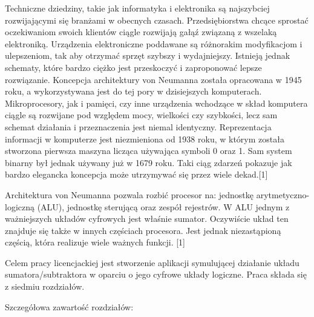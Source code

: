 \documentclass[12pt, a4paper, onside, polish]{article}				%
\begin{document}
Techniczne dziedziny, takie jak informatyka i elektronika są najszybciej rozwijającymi się branżami w obecnych czasach. Przedsiębiorstwa chcące sprostać oczekiwaniom swoich klientów ciągle rozwijają gałąź związaną z wszelaką elektroniką. Urządzenia elektroniczne poddawane są różnorakim modyfikacjom i ulepszeniom, tak aby otrzymać sprzęt szybszy i wydajniejszy. Istnieją jednak schematy, które bardzo ciężko jest przeskoczyć i zaproponować lepsze rozwiązanie. Koncepcja architektury von Neumanna została opracowana w 1945 roku, a wykorzystywana jest do tej pory w dzisiejszych komputerach. Mikroprocesory, jak i pamięci, czy inne urządzenia wchodzące w skład komputera ciągle są rozwijane pod względem mocy, wielkości czy szybkości, lecz sam schemat działania i przeznaczenia jest niemal identyczny. Reprezentacja informacji w komputerze jest niezmieniona od 1938 roku, w którym została stworzona pierwsza maszyna licząca używająca symboli 0 oraz 1. Sam system binarny był jednak używany już w 1679 roku. Taki ciąg zdarzeń pokazuje jak bardzo elegancka koncepcja może utrzymywać się przez wiele dekad.[1]

Architektura von Neumanna pozwala rozbić procesor na: jednostkę arytmetyczno-logiczną (ALU), jednostkę sterującą oraz zespół rejestrów. W ALU jednym z ważniejszych układów cyfrowych jest właśnie sumator. Oczywiście układ ten znajduje się także w innych częściach procesora. Jest jednak niezastąpioną częścią, która realizuje wiele ważnych funkcji. [1]\newline

Celem pracy licencjackiej jest stworzenie aplikacji symulującej działanie układu sumatora/subtraktora w oparciu o jego cyfrowe układy logiczne. Praca składa się z siedmiu rozdziałów.\newline

Szczegółowa zawartość rozdziałów:
\end{document}
